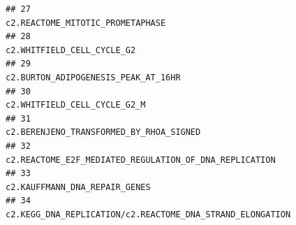 \documentclass{article}\usepackage[]{graphicx}\usepackage[]{color}
\makeatletter
\newenvironment{kframe}{%
 \def\at@end@of@kframe{}%
 \ifinner\ifhmode%
  \def\at@end@of@kframe{\end{minipage}}%
  \begin{minipage}{\columnwidth}%
 \fi\fi%
 \def\FrameCommand##1{\hskip\@totalleftmargin \hskip-\fboxsep
 \colorbox{shadecolor}{##1}\hskip-\fboxsep
     \hskip-\linewidth \hskip-\@totalleftmargin \hskip\columnwidth}%
 \MakeFramed {\advance\hsize-\width
   \@totalleftmargin\z@ \linewidth\hsize
   \@setminipage}}%
 {\par\unskip\endMakeFramed%
 \at@end@of@kframe}
\newenvironment{knitrout}{}{} %
\makeatother
\begin{document}
\begin{knitrout}
\begin{kframe}
\begin{verbatim}
## 27                                                                                                                                                                                                                                                                                                                       c2.REACTOME_MITOTIC_PROMETAPHASE
## 28                                                                                                                                                                                                                                                                                                                             c2.WHITFIELD_CELL_CYCLE_G2
## 29                                                                                                                                                                                                                                                                                                                    c2.BURTON_ADIPOGENESIS_PEAK_AT_16HR
## 30                                                                                                                                                                                                                                                                                                                           c2.WHITFIELD_CELL_CYCLE_G2_M
## 31                                                                                                                                                                                                                                                                                                                c2.BERENJENO_TRANSFORMED_BY_RHOA_SIGNED
## 32                                                                                                                                                                                                                                                                                                 c2.REACTOME_E2F_MEDIATED_REGULATION_OF_DNA_REPLICATION
## 33                                                                                                                                                                                                                                                                                                                          c2.KAUFFMANN_DNA_REPAIR_GENES
## 34                                                                                                                                                                                                                                                                                              c2.KEGG_DNA_REPLICATION/c2.REACTOME_DNA_STRAND_ELONGATION

\end{verbatim}
\end{kframe}
\end{knitrout}
\end{document}
